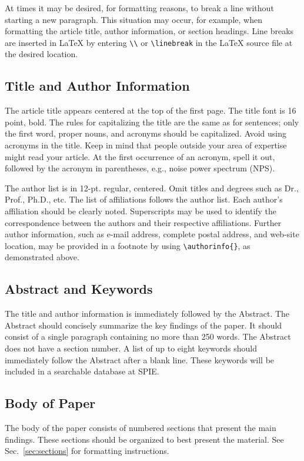 \documentclass[nocompress]{spie}  %
\begin{document}
At times it may be desired, for formatting reasons, to break a line without starting a new paragraph.  This situation may occur, for example, when formatting the article title, author information, or section headings.  Line breaks are inserted in LaTeX by entering \verb|\\| or \verb|\linebreak| in the LaTeX source file at the desired location.  

\subsection{Title and Author Information}
\label{sec:title}

The article title appears centered at the top of the first page.  The title font is 16 point, bold.  The rules for capitalizing the title are the same as for sentences; only the first word, proper nouns, and acronyms should be capitalized.  Avoid using acronyms in the title.  Keep in mind that people outside your area of expertise might read your article. At the first occurrence of an acronym, spell it out, followed by the acronym in parentheses, e.g., noise power spectrum (NPS). 

The author list is in 12-pt. regular, centered. Omit titles and degrees such as Dr., Prof., Ph.D., etc. The list of affiliations follows the author list. Each author's affiliation should be clearly noted. Superscripts may be used to identify the correspondence between the authors and their respective affiliations.  Further author information, such as e-mail address, complete postal address, and web-site location, may be provided in a footnote by using \verb|\authorinfo{}|, as demonstrated above.

\subsection{Abstract and Keywords}
The title and author information is immediately followed by the Abstract. The Abstract should concisely summarize the key findings of the paper.  It should consist of a single paragraph containing no more than 250 words.  The Abstract does not have a section number.  A list of up to eight keywords should immediately follow the Abstract after a blank line.  These keywords will be included in a searchable database at SPIE.

\subsection{Body of Paper}
The body of the paper consists of numbered sections that present the main findings.  These sections should be organized to best present the material.  See Sec.~\ref{sec:sections} for formatting instructions.
\end{document}
